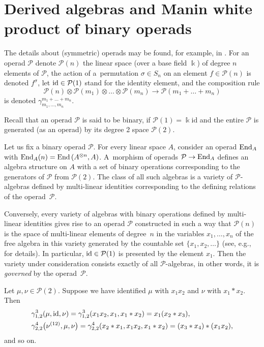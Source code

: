 \documentclass[pdftex]{sigma}
\numberwithin{equation}{section}
\def\id {\mathop {\fam 0 id}\nolimits}
\def\End {\mathop {\fam 0 End}\nolimits}
\begin{document}
\section{Derived algebras and Manin white product of binary operads}

The details about (symmetric) operads may be found, for example,
in \cite{Bremner-Dotsenko}.
For an operad $\mathcal P$ denote
$\mathcal P(n)$ the linear space (over a base field $\Bbbk $)
of degree $n$ elements of $\mathcal P$, the action of a~permutation $\sigma \in S_n$
on an element $f\in \mathcal P(n)$ is denoted $f^\sigma $,
let $\id \in \mathcal P(1) $ stand for the identity element,
and the composition rule
\[
\mathcal P(n)\otimes \mathcal P(m_1)\otimes \dots \otimes \mathcal P(m_n) \to \mathcal P(m_1+\dots + m_n)
\]
is denoted $\gamma^{m_1+\dots+m_n}_{m_1,\dots , m_n}$.

Recall that an operad $\mathcal P$ is said to be binary, if
$\mathcal P(1)=\Bbbk \mathrm{id}$ and the entire
$\mathcal P$ is generated (as an operad) by its degree 2 space
$\mathcal P(2)$.

Let us fix a binary operad $\mathcal P$.
For every
linear space $A$, consider an operad
$\End_A$
with $\End_A(n)=\mathrm{End}\,(A^{\otimes n}, A)$.
A~morphism of operads
$\mathcal P \to \End_A$ defines an algebra structure
on $A$ with a set of binary operations corresponding
to the generators of $\mathcal P$ from $\mathcal P(2)$.
The class of all such algebras is a variety
 of $\mathcal P$-algebras
defined by multi-linear identities corresponding
to the defining relations of the operad~$\mathcal P$.

Conversely, every variety of algebras with binary operations
defined by multi-linear identities gives rise to
an operad $\mathcal P$ constructed in such a way that
$\mathcal P(n)$ is the space of multi-linear elements
of degree~$n$ in the variables $x_1,\ldots, x_n$
of the free algebra in this variety generated by the countable set
$\{x_1,x_2,\ldots \}$
(see, e.g., \cite[Section~1.3.5]{Kol2008_smz} for details).
In particular, $\id\in \mathcal P(1)$
is presented by the element $x_1$.
Then the variety under consideration consists
exactly of all $\mathcal P$-algebras, in other words, it is
{\em governed} by the operad~$\mathcal P$.

\begin{Example}
Let $\mu,\nu \in \mathcal P(2)$. Suppose we have identified
$\mu $ with $x_1x_2$ and $\nu $ with $x_1*x_2$.
Then{\samepage
\begin{gather*}
\begin{split}
&\gamma^3_{1,2}(\mu, \id, \nu )
= \gamma^3_{1,2} (x_1x_2, x_1, x_1*x_2)
= x_1(x_2*x_3),
\\
&\gamma^4_{2,2}\bigl(\nu^{(12)}, \mu, \nu \bigr)
= \gamma^4_{2,2}(x_2*x_1, x_1x_2, x_1*x_2)
= (x_3*x_4)*(x_1x_2),
\end{split}
\end{gather*}
and so on.}
\end{Example}
\end{document}

